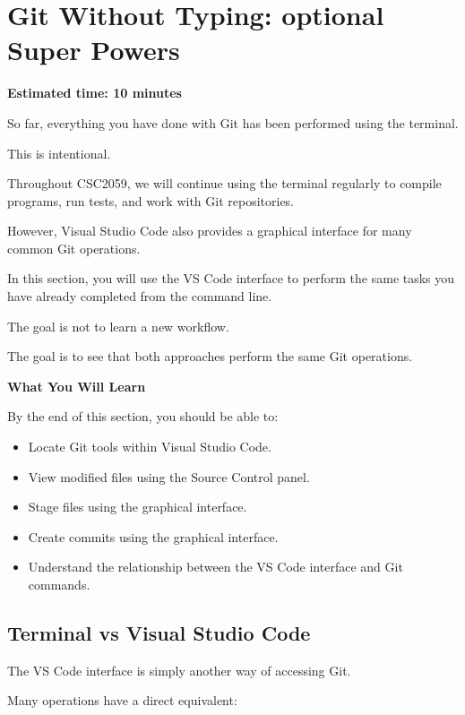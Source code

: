 \documentclass{csc2059practical}
\begin{document}
\clearpage
\section{Git Without Typing: optional Super Powers}
\begin{infobox}
\textbf{Estimated time: 10 minutes}
\end{infobox}
So far, everything you have done with Git has been performed using the terminal.

This is intentional.

Throughout CSC2059, we will continue using the terminal regularly to compile programs, run tests, and work with Git repositories.

However, Visual Studio Code also provides a graphical interface for many common Git operations.

In this section, you will use the VS Code interface to perform the same tasks you have already completed from the command line.

The goal is not to learn a new workflow.

The goal is to see that both approaches perform the same Git operations.

\begin{learningoutcomes}
\textbf{What You Will Learn}\par
\medskip
By the end of this section, you should be able to:

\begin{itemize}
  \item Locate Git tools within Visual Studio Code.
  \item View modified files using the Source Control panel.
  \item Stage files using the graphical interface.
  \item Create commits using the graphical interface.
  \item Understand the relationship between the VS Code interface and Git commands.
\end{itemize}
\end{learningoutcomes}
\subsection{Terminal vs Visual Studio Code}
The VS Code interface is simply another way of accessing Git.

Many operations have a direct equivalent:
\end{document}
